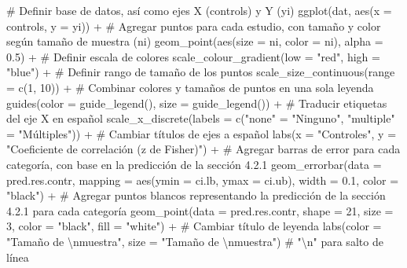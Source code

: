 \documentclass[
  bookmarksnumbered]{article}
\newenvironment{Shaded}{\begin{snugshade}}{\end{snugshade}}
\newcommand{\AttributeTok}[1]{\textcolor[rgb]{0.00,0.34,0.68}{#1}}
\newcommand{\CommentTok}[1]{\textcolor[rgb]{0.54,0.53,0.53}{#1}}
\newcommand{\DecValTok}[1]{\textcolor[rgb]{0.69,0.50,0.00}{#1}}
\newcommand{\FloatTok}[1]{\textcolor[rgb]{0.69,0.50,0.00}{#1}}
\newcommand{\FunctionTok}[1]{\textcolor[rgb]{0.39,0.29,0.61}{#1}}
\newcommand{\NormalTok}[1]{\textcolor[rgb]{0.12,0.11,0.11}{#1}}
\newcommand{\OtherTok}[1]{\textcolor[rgb]{0.00,0.43,0.16}{#1}}
\newcommand{\SpecialCharTok}[1]{\textcolor[rgb]{0.24,0.68,0.91}{#1}}
\newcommand{\StringTok}[1]{\textcolor[rgb]{0.75,0.01,0.01}{#1}}
\begin{document}
\begin{Shaded}
\begin{Highlighting}[]
\CommentTok{\# Definir base de datos, así como ejes X (controls) y Y (yi)}
\FunctionTok{ggplot}\NormalTok{(dat, }\FunctionTok{aes}\NormalTok{(}\AttributeTok{x =}\NormalTok{ controls, }\AttributeTok{y =}\NormalTok{ yi)) }\SpecialCharTok{+}
  \CommentTok{\# Agregar puntos para cada estudio, con tamaño y color según tamaño de muestra (ni)}
  \FunctionTok{geom\_point}\NormalTok{(}\FunctionTok{aes}\NormalTok{(}\AttributeTok{size =}\NormalTok{ ni, }\AttributeTok{color =}\NormalTok{ ni), }\AttributeTok{alpha =} \FloatTok{0.5}\NormalTok{) }\SpecialCharTok{+}
  \CommentTok{\# Definir escala de colores}
  \FunctionTok{scale\_colour\_gradient}\NormalTok{(}\AttributeTok{low =} \StringTok{"red"}\NormalTok{, }\AttributeTok{high =} \StringTok{"blue"}\NormalTok{) }\SpecialCharTok{+}
  \CommentTok{\# Definir rango de tamaño de los puntos}
  \FunctionTok{scale\_size\_continuous}\NormalTok{(}\AttributeTok{range =} \FunctionTok{c}\NormalTok{(}\DecValTok{1}\NormalTok{, }\DecValTok{10}\NormalTok{)) }\SpecialCharTok{+}
  \CommentTok{\# Combinar colores y tamaños de puntos en una sola leyenda}
  \FunctionTok{guides}\NormalTok{(}\AttributeTok{color =} \FunctionTok{guide\_legend}\NormalTok{(), }\AttributeTok{size =} \FunctionTok{guide\_legend}\NormalTok{()) }\SpecialCharTok{+}
  \CommentTok{\# Traducir etiquetas del eje X en español}
  \FunctionTok{scale\_x\_discrete}\NormalTok{(}\AttributeTok{labels =} \FunctionTok{c}\NormalTok{(}\StringTok{"none"} \OtherTok{=} \StringTok{"Ninguno"}\NormalTok{, }\StringTok{"multiple"} \OtherTok{=} \StringTok{"Múltiples"}\NormalTok{)) }\SpecialCharTok{+}
  \CommentTok{\# Cambiar títulos de ejes a español}
  \FunctionTok{labs}\NormalTok{(}\AttributeTok{x =} \StringTok{"Controles"}\NormalTok{, }\AttributeTok{y =} \StringTok{"Coeficiente de correlación (z de Fisher)"}\NormalTok{) }\SpecialCharTok{+}
  \CommentTok{\# Agregar barras de error para cada categoría, con base en la predicción de la sección 4.2.1}
  \FunctionTok{geom\_errorbar}\NormalTok{(}\AttributeTok{data =}\NormalTok{ pred.res.contr, }\AttributeTok{mapping =} \FunctionTok{aes}\NormalTok{(}\AttributeTok{ymin =}\NormalTok{ ci.lb, }\AttributeTok{ymax =}\NormalTok{ ci.ub),}
                \AttributeTok{width =} \FloatTok{0.1}\NormalTok{, }\AttributeTok{color =} \StringTok{"black"}\NormalTok{) }\SpecialCharTok{+}
  \CommentTok{\# Agregar puntos blancos representando la predicción de la sección 4.2.1 para cada categoría}
  \FunctionTok{geom\_point}\NormalTok{(}\AttributeTok{data =}\NormalTok{ pred.res.contr, }\AttributeTok{shape =} \DecValTok{21}\NormalTok{, }\AttributeTok{size =} \DecValTok{3}\NormalTok{, }\AttributeTok{color =} \StringTok{"black"}\NormalTok{, }\AttributeTok{fill =} \StringTok{"white"}\NormalTok{) }\SpecialCharTok{+}
  \CommentTok{\# Cambiar título de leyenda}
  \FunctionTok{labs}\NormalTok{(}\AttributeTok{color =} \StringTok{"Tamaño de }\SpecialCharTok{\textbackslash{}n}\StringTok{muestra"}\NormalTok{, }\AttributeTok{size =} \StringTok{"Tamaño de }\SpecialCharTok{\textbackslash{}n}\StringTok{muestra"}\NormalTok{) }\CommentTok{\# "\textbackslash{}n" para salto de línea}
\end{Highlighting}
\end{Shaded}
\end{document}
